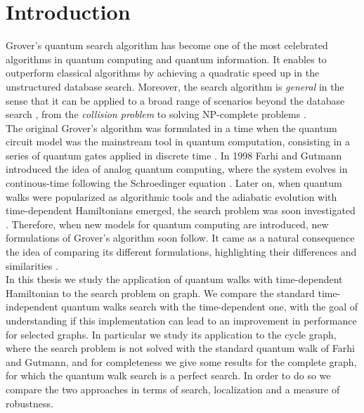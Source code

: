 \newpage
\vspace{-4cm}
\chapter*{\textbf{Introduction}}

\vspace{-2cm}
Grover's quantum search algorithm has become one of the most celebrated algorithms in quantum computing and quantum information. It enables to outperform classical algorithms by achieving a quadratic speed up in the unstructured database search. Moreover, the search algorithm is \textit{general} in the sense that it can be applied to a broad range of scenarios beyond the database search \cite{Nielsen2000}, from the \textit{collision problem} \cite{Brassard2015} to solving  NP-complete problems \cite{10.1007/978-3-540-78773-0_67}.\\


The original Grover's algorithm was formulated in a time when the quantum circuit model was the mainstream tool in quantum computation, consisting in a series of quantum gates applied in discrete time \cite{Wong2016}. In 1998 Farhi and Gutmann introduced the idea of analog quantum computing, where the system evolves in continous-time following the Schroedinger equation \cite{Farhi1998}. Later on, when quantum walks were popularized as algorithmic tools and the adiabatic evolution with time-dependent Hamiltonians emerged, the search problem was soon investigated \cite{Childs2004, Farhi2000}. Therefore, when new models for quantum computing are introduced, new formulations of Grover's algorithm soon follow. It came as a natural consequence the idea of comparing its different formulations, highlighting their differences and similarities \cite{Wong2016}. \\


In this thesis we study the application of quantum walks with time-dependent Hamiltonian to the search problem on graph. We compare the standard time-independent quantum walks search with the time-dependent one, with the goal of understanding if this implementation can lead to an improvement in performance for selected graphs. In particular we study its application to the cycle graph, where the search problem is not solved with the standard quantum walk of Farhi and Gutmann, and for completeness we give some results for the complete graph, for which the quantum walk search is a perfect search. In order to do so we compare the two approaches in terms of search, localization and a measure of robustness.\\ \\

